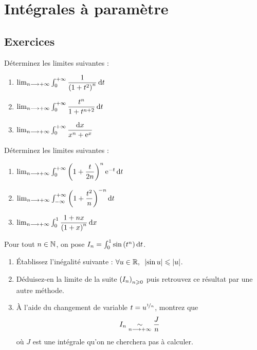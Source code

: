 \chapter{Intégrales à paramètre}

\minitoc

\section*{Exercices}

\begin{exos}
Déterminez les limites suivantes :

\begin{enumerate}
    \item \(\lim_{n\to\pinf}\int_0^{\pinf}\dfrac{1}{\paren{1+t^2}^n}\odif{t}\) \\
    \item \(\lim_{n\to\pinf}\int_0^{\pinf}\dfrac{t^n}{1+t^{n+2}}\odif{t}\) \\
    \item \(\lim_{n\to\pinf}\int_0^{\pinf}\dfrac{\odif{x}}{x^n+\e{x}}\)
\end{enumerate}
\end{exos}

\begin{exoss}
Déterminez les limites suivantes :

\begin{enumerate}
    \item \(\lim_{n\to\pinf}\int_0^{\pinf}\paren{1+\dfrac{t}{2n}}^n\e{-t}\odif{t}\) \\
    \item \(\lim_{n\to\pinf}\int_{\minf}^{\pinf}\paren{1+\dfrac{t^2}{n}}^{-n}\odif{t}\) \\
    \item \(\lim_{n\to\pinf}\int_0^1\dfrac{1+nx}{\paren{1+x}^n}\odif{x}\)
\end{enumerate}
\end{exoss}

\begin{exoss}
Pour tout \(n\in\mathbb{N}\), on pose \(I_n=\int_0^1\sin\paren{t^n}\odif{t}\).

\begin{enumerate}
    \item Établissez l'inégalité suivante : \(\quantifs{\forall u\in\R}\abs{\sin u}\leq\abs{u}\). \\
    \item Déduisez-en la limite de la suite \(\left(I_n\right)_{n\geqslant0}\) puis retrouvez ce résultat par une autre méthode. \\
    \item À l'aide du changement de variable \(t=u^{\nicefrac{1}{n}}\), montrez que \[I_n\underset{n\longrightarrow+\infty}{\sim}\dfrac{J}{n}\] où \(J\) est une intégrale qu'on ne cherchera pas à calculer.
\end{enumerate}
\end{exoss}

